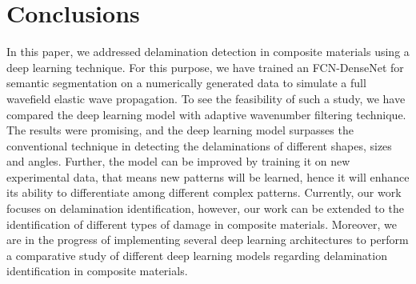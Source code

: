 \section{Conclusions}
In this paper, we addressed delamination detection in composite materials using a deep learning technique. 
For this purpose, we have trained an FCN-DenseNet for semantic segmentation on a numerically generated data to simulate a full wavefield elastic wave propagation.
To see the feasibility of such a study, we have compared the deep learning model with adaptive wavenumber filtering technique.
The results were promising, and the deep learning model surpasses the conventional technique in detecting the delaminations of different shapes, sizes and angles. 
Further, the model can be improved by training it on new experimental data, that means new patterns will be learned, hence it will enhance its ability to differentiate among different complex patterns.
Currently, our work focuses on delamination identification, however, our work can be extended to the identification of different types of damage in composite materials.
Moreover, we are in the progress of implementing several deep learning architectures to perform a comparative study of different deep learning models regarding delamination identification in composite materials.
